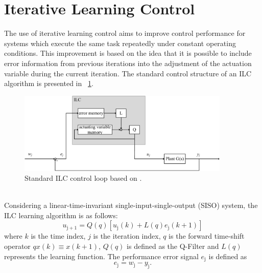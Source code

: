 \section{Iterative Learning Control}\label{ILC}
The use of iterative learning control aims to improve control performance for systems which execute the same task repeatedly under constant operating conditions. This improvement is based on the idea that it is possible to include error information from previous iterations into the adjustment of the actuation variable during the current iteration.
The standard control structure of an ILC algorithm is presented in \figurename~\ref{fig:ILC_only}.
\begin{figure}[ht]
   \centering
   \includegraphics[width=0.9\textwidth]{images/chapt_3/ILC_only.pdf}
   \caption[Standard ILC control loop]{Standard ILC control loop based on \cite{ILC2}.}
   \label{fig:ILC_only}
 \end{figure}
\\Considering a linear-time-invariant single-input-single-output (SISO) system, the ILC learning algorithm is as follows:
\begin{equation}
    u_{\mathrm{j+1}}  = Q(q)[u_{\mathrm{j}}(k)+L(q)e_{\mathrm{j}}(k+1)]
 \label{eq:ILC_standard}
\end{equation}
where $k$ is the time index, $j$ is the iteration index, $q$ is the forward time-shift operator $qx(k) \equiv x(k + 1)$, $Q(q)$ is defined as the Q-Filter and $L(q)$ represents the learning function. The performance error signal $e_{\mathrm{j}}$ is defined as
\begin{equation}
    e_{\mathrm{j}}  = w_{\mathrm{j}}-y_{\mathrm{j}}.
 \label{eq:perf_error}
\end{equation}


